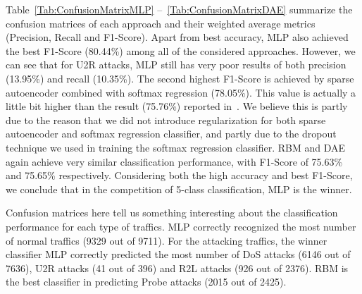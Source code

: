 Table~\ref{Tab:ConfusionMatrixMLP} --~\ref{Tab:ConfusionMatrixDAE} summarize the confusion matrices
of each approach and their weighted average metrics (Precision, Recall and F1-Score).
Apart from best accuracy, MLP also achieved the best F1-Score (80.44\%)
among all of the considered approaches.
However, we can see that for U2R attacks, MLP still has very poor results of
both precision (13.95\%) and recall (10.35\%).
The second highest F1-Score is achieved by sparse autoencoder combined with softmax regression (78.05\%).
This value is actually a little bit higher than the result (75.76\%) reported in~\cite{STL-NIDS}.
We believe this is partly due to the reason that we did not introduce regularization
for both sparse autoencoder and softmax regression classifier,
and partly due to the dropout technique we used in training the softmax regression classifier.
RBM and DAE again achieve very similar classification performance,
with F1-Score of 75.63\% and 75.65\% respectively.
Considering both the high accuracy and best F1-Score, we conclude that in the competition of
5-class classification, MLP is the winner.

Confusion matrices here tell us something interesting about the classification performance
for each type of traffics.
MLP correctly recognized the most number of normal traffics (9329 out of 9711).
For the attacking traffics, the winner classifier MLP correctly predicted the most
number of DoS attacks (6146 out of 7636), U2R attacks (41 out of 396)
and R2L attacks (926 out of 2376).
RBM is the best classifier in predicting Probe attacks (2015 out of 2425).


